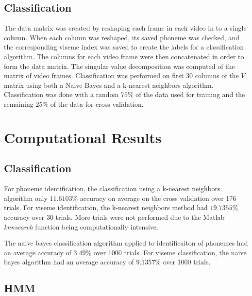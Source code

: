 \documentclass[a4paper]{article}
\begin{document}
\subsection{Classification}
The data matrix was created by reshaping each frame in each video in to a single column.  When each column was reshaped, its saved phoneme was checked, and the corresponding viseme index was saved to create the labels for a classification algorithm. The columns for each video frame were then concatenated in order to form the data matrix.  The singular value decomposition was computed of the matrix of video frames.  Classification was performed on first 30 columns of the $V$ matrix using both a Naive Bayes and a k-nearest neighbors algorithm.  Classification was done with a random $75\%$ of the data used for training and the remaining $25\%$ of the data for cross validation.

\section{Computational Results}

\subsection{Classification}
For phoneme identification, the classification using a k-nearest neighbors algorithm only $11.6103\%$ accuracy on average on the cross validation over 176 trials.  For viseme identification, the k-nearest neighbors method had $19.7355\%$ accuracy over 30 trials.  More trials were not performed due to the Matlab {\it knnsearch} function being computationally intensive.  

The naive bayes classification algorithm applied to identificaiton of phonemes had an average accuracy of $3.49\%$ over 1000 trials.  For viseme classification, the naive bayes algorithm had an average accuracy of $9.1357\%$ over 1000 trials. 

\subsection{HMM}
\end{document}

